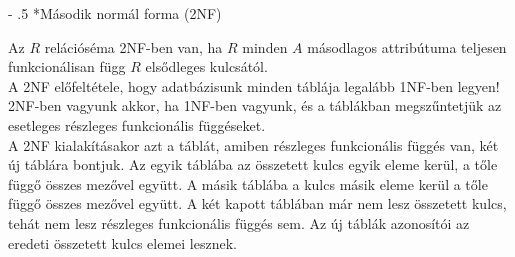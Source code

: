 \documentclass[tikz,12pt,margin=0px]{article}
\makeatletter
\renewcommand\paragraph{%
	\@startsection{paragraph}{4}{0mm}%
	{-\baselineskip}%
	{.5\baselineskip}%
	{\normalfont\normalsize\bfseries}}
\makeatother
\begin{document}
{    \paragraph*{Második normál forma (2NF)\\}

    \noindent Az $R$ relációséma 2NF-ben van, ha $R$ minden $A$ másodlagos attribútuma teljesen funkcionálisan függ $R$ elsődleges kulcsától.\\

    \noindent A 2NF előfeltétele, hogy adatbázisunk minden táblája legalább 1NF-ben legyen! 2NF-ben vagyunk akkor, ha 1NF-ben vagyunk, és a táblákban megszűntetjük az esetleges részleges funkcionális függéseket.\\

    \noindent A 2NF kialakításakor azt a táblát, amiben részleges funkcionális függés van, két új táblára bontjuk. Az egyik táblába az összetett kulcs egyik eleme kerül, a tőle függő összes mezővel együtt. A másik táblába a kulcs másik eleme kerül a tőle függő összes mezővel együtt. A két kapott táblában már nem lesz összetett kulcs, tehát nem lesz részleges funkcionális függés sem. Az új táblák azonosítói az eredeti összetett kulcs elemei lesznek.\\

}
\end{document}
